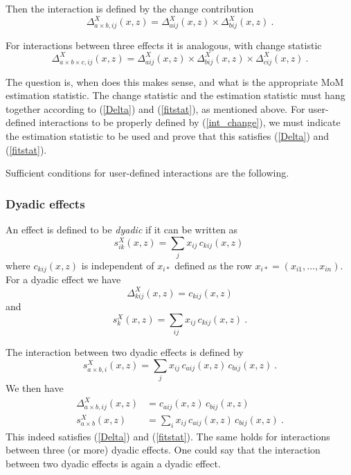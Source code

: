 \documentclass[a4paper,12pt,fleqn]{article}
\begin{document}
Then the interaction is defined by the change contribution
\begin{equation}
\Delta_{a \times b,ij}^X(x,z) = \Delta_{aij}^X(x,z) \times  \Delta_{bij}^X(x,z) \ . \label{int_change}
\end{equation}

For interactions between three effects it is analogous,
with change statistic
\[
\Delta_{a \times b \times c,ij}^X(x,z) = \Delta_{aij}^X(x,z) \times \Delta_{bij}^X(x,z)
                                             \times \Delta_{cij}^X(x,z) \ .
\]

The question is, when does this makes sense, and what is the appropriate
MoM estimation statistic.
The change statistic and the estimation statistic must hang together according to
(\ref{Delta}) and (\ref{fitstat}), as mentioned above.
For user-defined interactions to be properly defined by (\ref{int_change}),
we must indicate the estimation statistic to be used
and prove that this satisfies (\ref{Delta}) and (\ref{fitstat}).

Sufficient conditions for user-defined interactions are
the following.

\subsubsection{Dyadic effects}
\label{S_dyadic}

An effect is defined to be \emph{dyadic} if it can be written as
\begin{equation}
 s_{ik}^X(x,z) = \sum_j x_{ij}\, c_{kij}(x,z) \        \label{dyadic}
\end{equation}
where $c_{kij}(x,z)$ is independent of $x_{i\ast}$ defined as the
row $x_{i\ast} = (x_{i1}, \ldots, x_{in})$.\\
For a dyadic effect we have
\[
 \Delta_{kij}^X(x,z) = c_{kij}(x,z)
\]
and
\[
   s_{k}^X(x,z) = \sum_{ij} x_{ij}\, c_{kij}(x,z) \ .
\]

The interaction between two dyadic effects is defined by
\begin{equation}
 s_{a \times b,i}^X(x,z) = \sum_j x_{ij}\, c_{aij}(x,z)\, c_{bij}(x,z)   \ .  \label{dyadic_inter}
\end{equation}
We then have
\begin{align*}
 \Delta_{a \times b,ij}^X(x,z) &= c_{aij}(x,z)\, c_{bij}(x,z)   \\
   s_{a \times b}^X(x,z) &= \sum_{i} x_{ij}\, c_{aij}(x,z)\, c_{bij}(x,z) \ .
\end{align*}
This indeed satisfies (\ref{Delta}) and (\ref{fitstat}).
The same holds for interactions between three (or more) dyadic effects.
One could say that the interaction between two dyadic effects is again
a dyadic effect.
\end{document}
